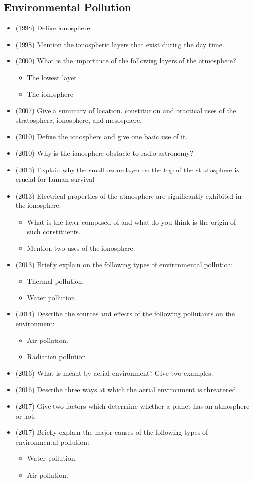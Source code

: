\documentclass{article}
\begin{document}
\subsection{Environmental Pollution}
\begin{itemize}
\item (1998)  Define ionosphere.
\item (1998)  Mention the ionospheric layers that exist during the day time.
\item (2000)  What is the importance of the following layers of the atmosphere?
 \begin{itemize}
\item The lowest layer
\item The ionosphere
\end{itemize}
\item (2007)  Give a summary of location, constitution and practical uses of the stratosphere, ionosphere, and mesosphere.
\item (2010)  Define the ionosphere and give one basic use of it.
\item (2010)  Why is the ionosphere obstacle to radio astronomy?
\item (2013)  Explain why the small ozone layer on the top of the stratosphere is crucial for human survival
\item (2013)  Electrical properties of the atmosphere are significantly exhibited in the ionosphere.
 \begin{itemize}
\item  What is the layer composed of and what do you think is the origin of such constituents.
\item  Mention two uses of the ionosphere.
\end{itemize}
\item (2013)  Briefly explain on the following types of environmental pollution:
 \begin{itemize}
\item  Thermal pollution.
\item  Water pollution.
\end{itemize}
\item (2014)  Describe the sources and effects of the following pollutants on the environment:
 \begin{itemize}
\item Air pollution. 
\item Radiation pollution.
\end{itemize}
\item (2016)  What is meant by aerial environment?  Give two examples.
\item (2016)  Describe three ways at which the aerial environment is threatened.
\item (2017)  Give two factors which determine whether a planet has an atmosphere or not.
\item (2017)  Briefly explain the major causes of the following types of environmental pollution:
 \begin{itemize}
\item Water pollution. 
\item  Air pollution.
\end{itemize}

\end{itemize}
\end{document}
